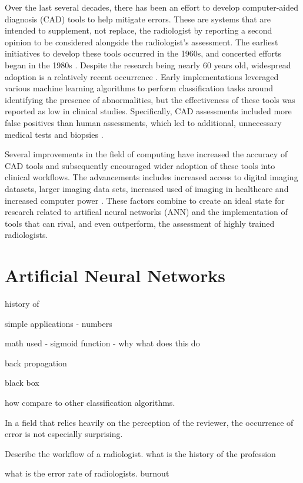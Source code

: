 \documentclass[sigconf]{acmart}
\begin{document}
Over the last several decades, there has been an effort to develop computer-aided diagnosis (CAD) tools to help mitigate errors. These are systems that are intended to supplement, not replace, the radiologist by reporting a second opinion to be considered alongside the radiologist's assessment. The earliest initiatives to develop these tools occurred in the 1960s, and concerted efforts began in the 1980s \cite{cite02}. Despite the research being nearly 60 years old, widespread adoption is a relatively recent occurrence \cite{cite03}. Early implementations leveraged various machine learning algorithms to perform classification tasks around identifying the presence of abnormalities, but the effectiveness of these tools was reported as low in clinical studies. Specifically, CAD assessments included more false positives than human assessments, which led to additional, unnecessary medical tests and biopsies \cite{05}.

Several improvements in the field of computing have increased the accuracy of CAD tools and subsequently encouraged wider adoption of these tools into clinical workflows. The advancements includes increased access to digital imaging datasets, larger imaging data sets, increased used of imaging in healthcare and increased computer power \cite{cite03}\cite{cite05}. These factors combine to create an ideal state for research related to artifical neural networks (ANN) and the implementation of tools that can rival, and even outperform, the assessment of highly trained radiologists.

\section{Artificial Neural Networks}

history of

simple applications - numbers

math used - sigmoid function - why what does this do

back propagation

black box

how compare to other classification algorithms.



In a field that relies heavily on the perception of the reviewer, the occurrence of error is not especially surprising. 

Describe the workflow of a radiologist. what is the history of the profession

what is the error rate of radiologists. burnout
\end{document}
